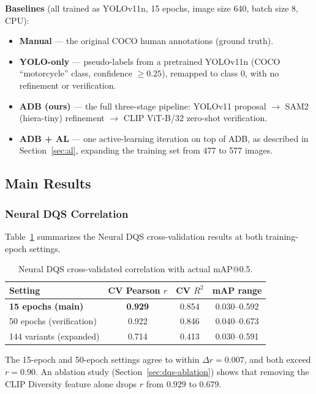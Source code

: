 \documentclass[11pt]{article}
\begin{document}
\textbf{Baselines} (all trained as YOLOv11n, 15 epochs, image size 640, batch
size 8, CPU):
\begin{itemize}
\item \textbf{Manual} --- the original COCO human annotations (ground truth).
\item \textbf{YOLO-only} --- pseudo-labels from a pretrained YOLOv11n (COCO
  ``motorcycle'' class, confidence $\geq 0.25$), remapped to class 0, with no
  refinement or verification.
\item \textbf{ADB (ours)} --- the full three-stage pipeline: YOLOv11
  proposal $\to$ SAM2 (hiera-tiny) refinement $\to$ CLIP ViT-B/32 zero-shot
  verification.
\item \textbf{ADB + AL} --- one active-learning iteration on top of ADB, as
  described in Section~\ref{sec:al}, expanding the training set from 477 to
  577 images.
\end{itemize}

\subsection{Main Results}

\subsubsection{Neural DQS Correlation}
\label{sec:dqs-results}

Table~\ref{tab:dqs-correlation} summarizes the Neural DQS cross-validation
results at both training-epoch settings.

\begin{table}[h]
\centering
\caption{Neural DQS cross-validated correlation with actual mAP@0.5.}
\label{tab:dqs-correlation}
\begin{tabular}{@{}lccc@{}}
\toprule
Setting & CV Pearson $r$ & CV $R^2$ & mAP range \\
\midrule
\textbf{15 epochs (main)} & \textbf{0.929} & 0.854 & 0.030--0.592 \\
50 epochs (verification) & 0.922 & 0.846 & 0.040--0.673 \\
144 variants (expanded) & 0.714 & 0.413 & 0.030--0.591 \\
\bottomrule
\end{tabular}
\end{table}

The 15-epoch and 50-epoch settings agree to within $\Delta r = 0.007$, and
both exceed $r=0.90$. An ablation study (Section~\ref{sec:dqs-ablation})
shows that removing the CLIP Diversity feature alone drops $r$ from $0.929$
to $0.679$.
\end{document}

